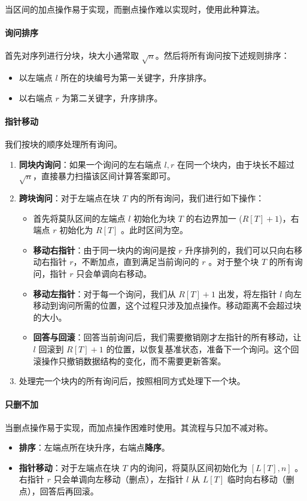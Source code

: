 当区间的加点操作易于实现，而删点操作难以实现时，使用此种算法。

\paragraph{询问排序}
首先对序列进行分块，块大小通常取 $\sqrt{n}$。然后将所有询问按下述规则排序：
\begin{itemize}
    \item 以左端点 $l$ 所在的块编号为第一关键字，升序排序。
    \item 以右端点 $r$ 为第二关键字，升序排序。
\end{itemize}

\paragraph{指针移动}
我们按块的顺序处理所有询问。
\begin{enumerate}
    \item \textbf{同块内询问}：如果一个询问的左右端点 $l, r$ 在同一个块内，由于块长不超过 $\sqrt{n}$，直接暴力扫描该区间计算答案即可。
    \item \textbf{跨块询问}：对于左端点在块 $T$ 内的所有询问，我们进行如下操作：
    \begin{itemize}
        \item 首先将莫队区间的左端点 $l$ 初始化为块 $T$ 的右边界加一 ($R[T]+1$)，右端点 $r$ 初始化为 $R[T]$ 。此时区间为空。
        \item \textbf{移动右指针}：由于同一块内的询问是按 $r$ 升序排列的，我们可以只向右移动右指针 $r$，不断加点，直到满足当前询问的 $r$ 。对于整个块 $T$ 的所有询问，指针 $r$ 只会单调向右移动。
        \item \textbf{移动左指针}：对于每一个询问，我们从 $R[T]+1$ 出发，将左指针 $l$ 向左移动到询问所需的位置，这个过程只涉及加点操作。移动距离不会超过块的大小。
        \item \textbf{回答与回滚}：回答当前询问后，我们需要撤销刚才左指针的所有移动，让 $l$ 回滚到 $R[T]+1$ 的位置，以恢复基准状态，准备下一个询问。这个回滚操作只撤销数据结构的变化，而不需要更新答案。
    \end{itemize}
    \item 处理完一个块内的所有询问后，按照相同方式处理下一个块。
\end{enumerate}

\paragraph{只删不加}
当删点操作易于实现，而加点操作困难时使用。其流程与只加不减对称。
\begin{itemize}
    \item \textbf{排序}：左端点所在块升序，右端点\textbf{降序}。
    \item \textbf{指针移动}：对于左端点在块 $T$ 内的询问，将莫队区间初始化为 $[L[T], n]$ 。右指针 $r$ 只会单调向左移动（删点），左指针 $l$ 从 $L[T]$ 临时向右移动（删点），回答后再回滚。
\end{itemize}
